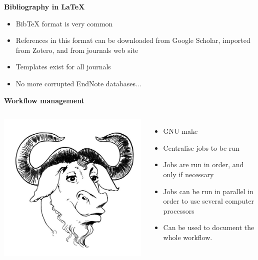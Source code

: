 \documentclass[9pt,xcolor=pdftex,dvipsnames,table]{beamer}
\begin{document}
\begin{frame}{\textbf{Bibliography in LaTeX}}
  \begin{itemize}
  \item BibTeX format is very common
  \item References in this format can be downloaded from Google
    Scholar, imported from Zotero, and from journals web site
  \item Templates exist for all journals
  \item No more corrupted EndNote databases...
  \end{itemize}
\end{frame}


\begin{frame}{\textbf{Workflow management}}
\begin{columns}
\centering
\includegraphics[width=1\textwidth]{images/make-logo.jpg}
  \begin{itemize}
  \item GNU make
  \item Centralise jobs to be run
  \item Jobs are run in order, and only if necessary
  \item Jobs can be run in parallel in order to use several computer processors
  \item Can be used to document the whole workflow.
  \end{itemize}
\end{columns}
\end{frame}
\end{document}
